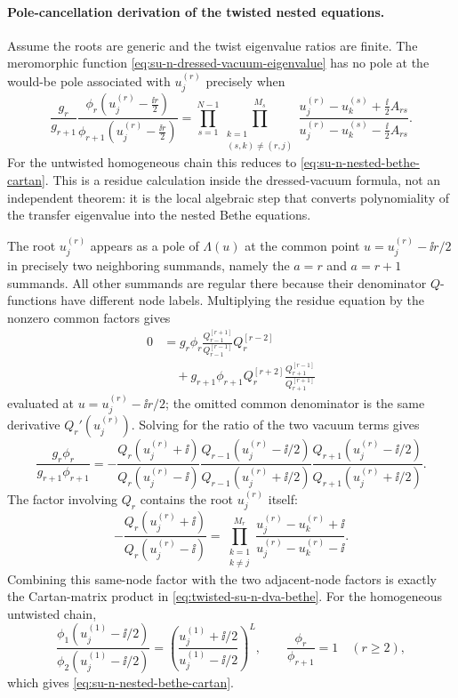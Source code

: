 \paragraph{Pole-cancellation derivation of the twisted nested equations.}
Assume the roots are generic and the twist eigenvalue ratios are finite.  The
meromorphic function \eqref{eq:su-n-dressed-vacuum-eigenvalue} has no pole at
the would-be pole associated with \(u_j^{(r)}\) precisely when
\begin{equation}
  \frac{g_r}{g_{r+1}}
  \frac{\phi_r(u_j^{(r)}-\frac{\ii r}{2})}
       {\phi_{r+1}(u_j^{(r)}-\frac{\ii r}{2})}
  =
  \prod_{s=1}^{N-1}
  \prod_{\substack{k=1\\(s,k)\ne(r,j)}}^{M_s}
  \frac{u_j^{(r)}-u_k^{(s)}+\frac{\ii}{2}A_{rs}}
       {u_j^{(r)}-u_k^{(s)}-\frac{\ii}{2}A_{rs}} .
  \label{eq:twisted-su-n-dva-bethe}
\end{equation}
For the untwisted homogeneous chain this reduces to
\eqref{eq:su-n-nested-bethe-cartan}.
This is a residue calculation inside the dressed-vacuum formula, not an
independent theorem: it is the local algebraic step that converts
polynomiality of the transfer eigenvalue into the nested Bethe equations.

The root \(u_j^{(r)}\) appears as a pole of \(\Lambda(u)\) at the common
point \(u=u_j^{(r)}-\ii r/2\) in precisely two neighboring summands,
namely the \(a=r\) and \(a=r+1\) summands.  All other summands are regular
there because their denominator \(Q\)-functions have different node labels.
Multiplying the residue equation by the nonzero common factors gives
\[
\begin{aligned}
0
&=
g_r\phi_r
  \frac{Q_{r-1}^{[r+1]}}{Q_{r-1}^{[r-1]}}
  Q_r^{[r-2]}
\\
&\quad+
g_{r+1}\phi_{r+1}
  Q_r^{[r+2]}
  \frac{Q_{r+1}^{[r-1]}}{Q_{r+1}^{[r+1]}}
\end{aligned}
\]
evaluated at \(u=u_j^{(r)}-\ii r/2\); the omitted common denominator is the
same derivative \(Q_r'(u_j^{(r)})\).  Solving for the ratio of the two vacuum
terms gives
\[
  \frac{g_r\phi_r}{g_{r+1}\phi_{r+1}}
  =
  -\frac{Q_r(u_j^{(r)}+\ii)}{Q_r(u_j^{(r)}-\ii)}
  \frac{Q_{r-1}(u_j^{(r)}-\ii/2)}
       {Q_{r-1}(u_j^{(r)}+\ii/2)}
  \frac{Q_{r+1}(u_j^{(r)}-\ii/2)}
       {Q_{r+1}(u_j^{(r)}+\ii/2)} .
\]
The factor involving \(Q_r\) contains the root \(u_j^{(r)}\) itself:
\[
  -\frac{Q_r(u_j^{(r)}+\ii)}{Q_r(u_j^{(r)}-\ii)}
  =
  \prod_{\substack{k=1\\k\ne j}}^{M_r}
  \frac{u_j^{(r)}-u_k^{(r)}+\ii}
       {u_j^{(r)}-u_k^{(r)}-\ii}.
\]
Combining this same-node factor with the two adjacent-node factors is exactly
the Cartan-matrix product in \eqref{eq:twisted-su-n-dva-bethe}.  For the
homogeneous untwisted chain,
\[
  \frac{\phi_1(u_j^{(1)}-\ii/2)}
       {\phi_2(u_j^{(1)}-\ii/2)}
  =
  \left(\frac{u_j^{(1)}+\ii/2}{u_j^{(1)}-\ii/2}\right)^L,
  \qquad
  \frac{\phi_r}{\phi_{r+1}}=1\quad(r\ge2),
\]
which gives \eqref{eq:su-n-nested-bethe-cartan}.

